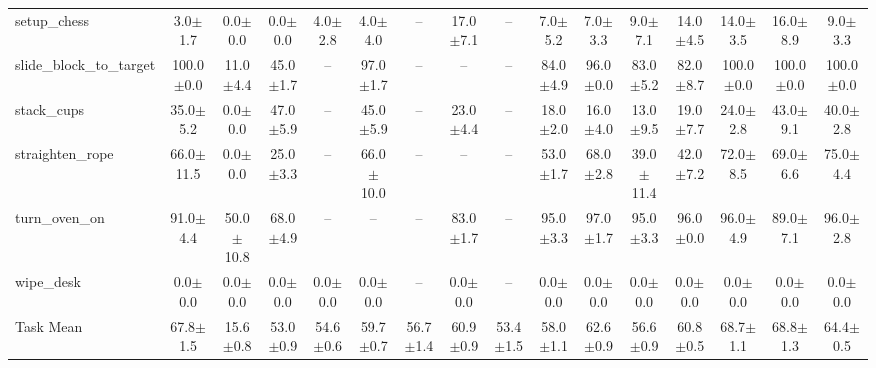 \begin{table}[t]
{\begin{tabular}{l*{15}{c}}
setup\_chess & 3.0$\pm$1.7 & 0.0$\pm$0.0 & 0.0$\pm$0.0 & 4.0$\pm$2.8 & 4.0$\pm$4.0 & -- & 17.0$\pm$7.1 & -- & 7.0$\pm$5.2 & 7.0$\pm$3.3 & 9.0$\pm$7.1 & 14.0$\pm$4.5 & 14.0$\pm$3.5 & 16.0$\pm$8.9 & 9.0$\pm$3.3 \\
slide\_block\_to\_target & 100.0$\pm$0.0 & 11.0$\pm$4.4 & 45.0$\pm$1.7 & -- & 97.0$\pm$1.7 & -- & -- & -- & 84.0$\pm$4.9 & 96.0$\pm$0.0 & 83.0$\pm$5.2 & 82.0$\pm$8.7 & 100.0$\pm$0.0 & 100.0$\pm$0.0 & 100.0$\pm$0.0 \\
stack\_cups & 35.0$\pm$5.2 & 0.0$\pm$0.0 & 47.0$\pm$5.9 & -- & 45.0$\pm$5.9 & -- & 23.0$\pm$4.4 & -- & 18.0$\pm$2.0 & 16.0$\pm$4.0 & 13.0$\pm$9.5 & 19.0$\pm$7.7 & 24.0$\pm$2.8 & 43.0$\pm$9.1 & 40.0$\pm$2.8 \\
straighten\_rope & 66.0$\pm$11.5 & 0.0$\pm$0.0 & 25.0$\pm$3.3 & -- & 66.0$\pm$10.0 & -- & -- & -- & 53.0$\pm$1.7 & 68.0$\pm$2.8 & 39.0$\pm$11.4 & 42.0$\pm$7.2 & 72.0$\pm$8.5 & 69.0$\pm$6.6 & 75.0$\pm$4.4 \\
turn\_oven\_on & 91.0$\pm$4.4 & 50.0$\pm$10.8 & 68.0$\pm$4.9 & -- & -- & -- & 83.0$\pm$1.7 & -- & 95.0$\pm$3.3 & 97.0$\pm$1.7 & 95.0$\pm$3.3 & 96.0$\pm$0.0 & 96.0$\pm$4.9 & 89.0$\pm$7.1 & 96.0$\pm$2.8 \\
wipe\_desk & 0.0$\pm$0.0 & 0.0$\pm$0.0 & 0.0$\pm$0.0 & 0.0$\pm$0.0 & 0.0$\pm$0.0 & -- & 0.0$\pm$0.0 & -- & 0.0$\pm$0.0 & 0.0$\pm$0.0 & 0.0$\pm$0.0 & 0.0$\pm$0.0 & 0.0$\pm$0.0 & 0.0$\pm$0.0 & 0.0$\pm$0.0 \\
\midrule
Task Mean & 67.8$\pm$1.5 & 15.6$\pm$0.8 & 53.0$\pm$0.9 & 54.6$\pm$0.6 & 59.7$\pm$0.7 & 56.7$\pm$1.4 & 60.9$\pm$0.9 & 53.4$\pm$1.5 & 58.0$\pm$1.1 & 62.6$\pm$0.9 & 56.6$\pm$0.9 & 60.8$\pm$0.5 & 68.7$\pm$1.1 & 68.8$\pm$1.3 & 64.4$\pm$0.5 \\
\bottomrule
\end{tabular}%
}
\end{table}
